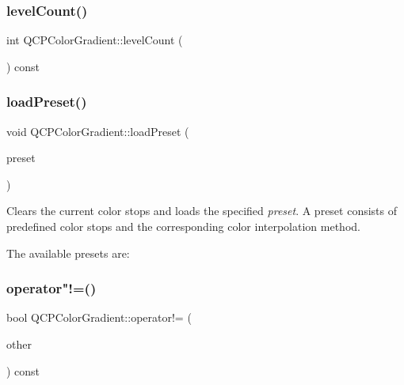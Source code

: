 \subsubsection{\texorpdfstring{levelCount()}{levelCount()}}
{\footnotesize\ttfamily int Q\+C\+P\+Color\+Gradient\+::level\+Count (\begin{DoxyParamCaption}{ }\end{DoxyParamCaption}) const\hspace{0.3cm}{\ttfamily [inline]}}

\mbox{\label{class_q_c_p_color_gradient_aa0aeec1528241728b9671bf8e60b1622}} 
\subsubsection{\texorpdfstring{loadPreset()}{loadPreset()}}
{\footnotesize\ttfamily void Q\+C\+P\+Color\+Gradient\+::load\+Preset (\begin{DoxyParamCaption}\item[{\mbox{\hyperlink{class_q_c_p_color_gradient_aed6569828fee337023670272910c9072}{Gradient\+Preset}}}]{preset }\end{DoxyParamCaption})}

Clears the current color stops and loads the specified {\itshape preset}. A preset consists of predefined color stops and the corresponding color interpolation method.

The available presets are\+:  \mbox{\label{class_q_c_p_color_gradient_ad26a10e3beaef4fc6f2553d1a9756087}} 
\subsubsection{\texorpdfstring{operator"!=()}{operator!=()}}
{\footnotesize\ttfamily bool Q\+C\+P\+Color\+Gradient\+::operator!= (\begin{DoxyParamCaption}\item[{const \mbox{\hyperlink{class_q_c_p_color_gradient}{Q\+C\+P\+Color\+Gradient}} \&}]{other }\end{DoxyParamCaption}) const\hspace{0.3cm}{\ttfamily [inline]}}

